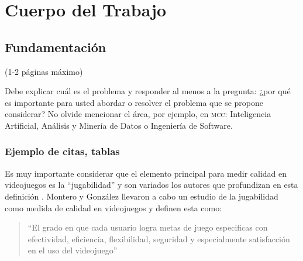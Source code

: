 \chapter{Cuerpo del Trabajo}

\section{Fundamentación}

(1-2 páginas máximo)

Debe explicar cuál es el problema y responder al menos a la pregunta: ¿por qué es importante para usted abordar o resolver el problema que se propone considerar? No olvide mencionar el área, por ejemplo, en \textsc{mcc}: Inteligencia Artificial, Análisis y Minería de Datos o Ingeniería de Software.

\subsection{Ejemplo de citas, tablas}

Es muy importante considerar que el elemento principal para medir calidad en videojuegos es la ``jugabilidad'' y son variados los autores que profundizan en esta definición \parencite{Playability-Quality-Videogames,Metric-Suite-Videogames,Playability-Heuristic,quality-metric-mobile-games}. Montero y González \parencite*{Playability-Quality-Videogames} llevaron a cabo un estudio de la jugabilidad como medida de calidad en videojuegos y definen esta como:

\begin{quote} 
	``El grado en que cada usuario logra metas de juego especificas con efectividad, eficiencia, flexibilidad, seguridad y especialmente satisfacción en el uso del videojuego''
\end{quote}

